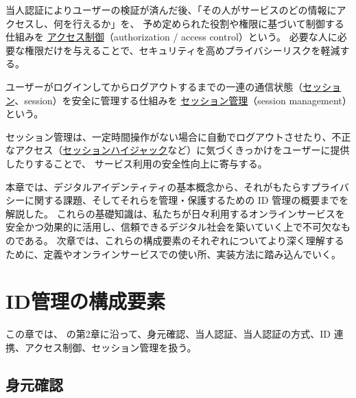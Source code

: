 \documentclass[uplatex]{jsarticle}
\def\label#1{}%
\begin{document}
\begin{dfn}[アクセス制御]\label{dfn:access-control}
当人認証によりユーザーの検証が済んだ後、「その人がサービスのどの情報にアクセスし、何を行えるか」を、
予め定められた役割や権限に基づいて制御する仕組みを \underline{アクセス制御}（authorization / access control）という。
必要な人に必要な権限だけを与えることで、セキュリティを高めプライバシーリスクを軽減する。
\end{dfn}

\begin{dfn}[セッション管理]\label{dfn:session-management}
ユーザーがログインしてからログアウトするまでの一連の通信状態（\underline{セッション}、session）を安全に管理する仕組みを
\underline{セッション管理}（session management）という。
\end{dfn}

\begin{exa}[セッション管理の働き]\label{exa:ch1-session-management}
セッション管理は、一定時間操作がない場合に自動でログアウトさせたり、不正なアクセス（\underline{セッションハイジャック}など）に気づくきっかけをユーザーに提供したりすることで、
サービス利用の安全性向上に寄与する。
\end{exa}

本章では、デジタルアイデンティティの基本概念から、それがもたらすプライバシーに関する課題、そしてそれらを管理・保護するための ID 管理の概要までを解説した。
これらの基礎知識は、私たちが日々利用するオンラインサービスを安全かつ効果的に活用し、信頼できるデジタル社会を築いていく上で不可欠なものである。
次章では、これらの構成要素のそれぞれについてより深く理解するために、定義やオンラインサービスでの使い所、実装方法に踏み込んでいく。

\section{ID管理の構成要素}

この章では、\cite{Ito2026} の第2章に沿って、身元確認、当人認証、当人認証の方式、ID 連携、アクセス制御、セッション管理を扱う。

\subsection{身元確認}\label{subsec:ch2-identity-proofing}
\end{document}
